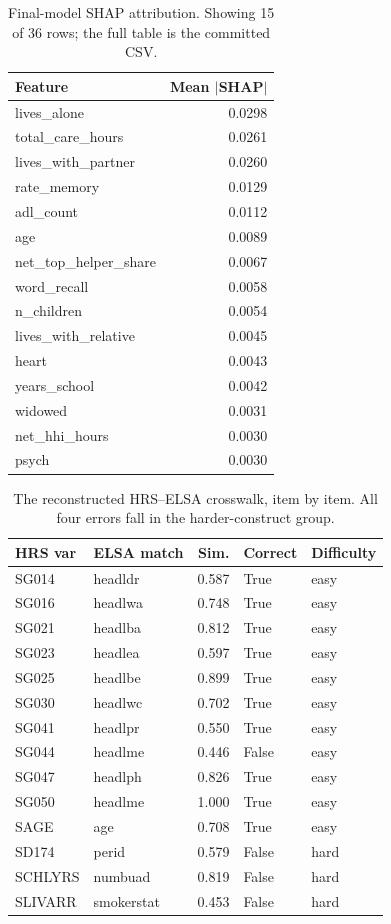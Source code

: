 \documentclass[9pt,twoside]{pnas-new}
\begin{document}
\begin{table}[!ht]
\centering
\caption{Final-model SHAP attribution. Showing 15 of 36 rows; the full table is the committed CSV.}
\label{tab:b-shap}
\footnotesize
\begin{tabular}{lr}
\toprule
Feature & Mean $|$SHAP$|$ \\
\midrule
lives\_alone & 0.0298 \\
total\_care\_hours & 0.0261 \\
lives\_with\_partner & 0.0260 \\
rate\_memory & 0.0129 \\
adl\_count & 0.0112 \\
age & 0.0089 \\
net\_top\_helper\_share & 0.0067 \\
word\_recall & 0.0058 \\
n\_children & 0.0054 \\
lives\_with\_relative & 0.0045 \\
heart & 0.0043 \\
years\_school & 0.0042 \\
widowed & 0.0031 \\
net\_hhi\_hours & 0.0030 \\
psych & 0.0030 \\
\bottomrule
\end{tabular}
\end{table}

\begin{table}[!ht]
\centering
\caption{The reconstructed HRS--ELSA crosswalk, item by item. All four errors fall in the harder-construct group.}
\label{tab:b-crosswalk}
\footnotesize
\begin{tabular}{llrll}
\toprule
HRS var & ELSA match & Sim. & Correct & Difficulty \\
\midrule
SG014 & headldr & 0.587 & True & easy \\
SG016 & headlwa & 0.748 & True & easy \\
SG021 & headlba & 0.812 & True & easy \\
SG023 & headlea & 0.597 & True & easy \\
SG025 & headlbe & 0.899 & True & easy \\
SG030 & headlwc & 0.702 & True & easy \\
SG041 & headlpr & 0.550 & True & easy \\
SG044 & headlme & 0.446 & False & easy \\
SG047 & headlph & 0.826 & True & easy \\
SG050 & headlme & 1.000 & True & easy \\
SAGE & age & 0.708 & True & easy \\
SD174 & perid & 0.579 & False & hard \\
SCHLYRS & numbuad & 0.819 & False & hard \\
SLIVARR & smokerstat & 0.453 & False & hard \\
\bottomrule
\end{tabular}
\end{table}
\end{document}
